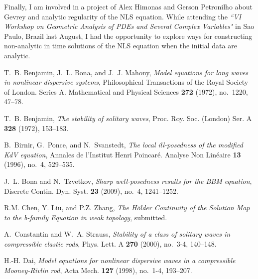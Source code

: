 \documentclass[12pt,reqno]{amsart}
\begin{document}
Finally, I am involved in a project of Alex Himonas 
and Gerson Petronilho about Gevrey
and analytic regularity of the NLS equation.
While attending the {\em ``VI Workshop on Geometric Analysis of PDEs and Several Complex Variables"} \/in Sao Paulo, Brazil last August,
I had the opportunity to explore ways for constructing
non-analytic in time solutions of the NLS equation
when the initial data are analytic. 
\providecommand{\bysame}{\leavevmode\hbox to3em{\hrulefill}\thinspace}
\providecommand{\MR}{\relax\ifhmode\unskip\space\fi MR }
\providecommand{\MRhref}[2]{%
  \href{http://www.ams.org/mathscinet-getitem?mr=#1}{#2}
}
\providecommand{\href}[2]{#2}
\begin{thebibliography}{dLKT07}

T.~B. Benjamin, J.~L. Bona, and J.~J. Mahony, \emph{{Model equations for long
  waves in nonlinear dispersive systems}}, Philosophical Transactions of the
  Royal Society of London. Series A. Mathematical and Physical Sciences
  \textbf{272} (1972), no.~1220, 47--78.

T.~B. Benjamin, \emph{{The stability of solitary waves}}, Proc. Roy. Soc.
  (London) Ser. A \textbf{328} (1972), 153--183.

B.~Birnir, G.~Ponce, and N.~Svanstedt, \emph{{The local ill-posedness of the
  modified KdV equation}}, Annales de l'Institut Henri Poincar{\'e}. Analyse
  Non Lin{\'e}aire \textbf{13} (1996), no.~4, 529--535.

J.~L. Bona and N.~Tzvetkov, \emph{{Sharp well-posedness results for the BBM
  equation}}, Discrete Contin. Dyn. Syst. \textbf{23} (2009), no.~4,
  1241--1252.

R.M. Chen, Y. Liu, and P.Z. Zhang, \emph{{The H{\"o}lder Continuity of the Solution Map to the
  b-family Equation in weak topology}}, submitted.

A.~Constantin and W.~A. Strauss, \emph{{Stability of a class of solitary waves
  in compressible elastic rods}}, Phys. Lett. A \textbf{270} (2000), no.~3-4,
  140--148.

H.-H. Dai, \emph{{Model equations for nonlinear dispersive waves in a
  compressible Mooney-Rivlin rod}}, Acta Mech. \textbf{127} (1998), no.~1-4,
  193--207.


\end{thebibliography}
\end{document}
